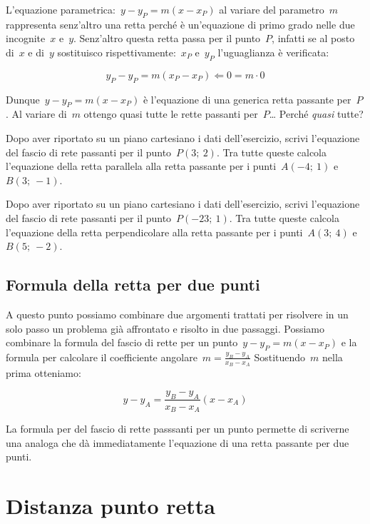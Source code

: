 L'equazione parametrica:~\(y - y_P = m (x - x_P)\) al variare del parametro~\(m\) 
rappresenta senz'altro una retta perché è un'equazione di primo grado nelle 
due incognite~\(x\) e~\(y\). Senz'altro questa retta passa per il punto~\(P\), 
infatti se al posto di~\(x\) e di~\(y\) sostituisco 
rispettivamente:~\(x_P\) e~\(y_P\) l'uguaglianza è verificata:

\[y_P - y_P = m (x_P - x_P) \Leftarrow 0 = m \cdot 0\]

Dunque~\(y - y_P = m (x - x_P)\) è l'equazione di una generica retta passante 
per~\(P\). Al variare di~\(m\) ottengo quasi tutte le rette passanti per~\(P\)\dots 
Perché \emph{quasi} tutte?

\begin{exrig}
 \begin{esempio}
  Dopo aver riportato su un piano cartesiano i dati dell'esercizio,
  scrivi l'equazione del fascio di rete passanti per il punto~\(P(3;~2)\).
  Tra tutte queste calcola l'equazione della retta parallela alla retta 
  passante per i punti~\(A(-4;~1)\) e~\(B(3;~-1)\).
 \end{esempio}
 \begin{esempio}
  Dopo aver riportato su un piano cartesiano i dati dell'esercizio,
  scrivi l'equazione del fascio di rete passanti per il punto~\(P(-23;~1)\).
  Tra tutte queste calcola l'equazione della retta perpendicolare alla retta 
  passante per i punti~\(A(3;~4)\) e~\(B(5;~-2)\).
 \end{esempio}
\end{exrig}

\subsection{Formula della retta per due punti}

A questo punto possiamo combinare due argomenti trattati per risolvere in un
solo passo un problema già affrontato e risolto in due passaggi. 
Possiamo combinare la formula del fascio di rette per un 
punto~\(y - y_P = m (x - x_P)\)
e la formula per calcolare il 
coefficiente angolare~\(m = \frac{y_B - y_A}{x_B - x_A}\) 
Sostituendo~\(m\) nella prima otteniamo:

\[y - y_A = \frac{y_B - y_A}{x_B - x_A} (x - x_A)\]

La formula per del fascio di rette passsanti per un punto permette di 
scriverne una analoga che dà immediatamente l'equazione di una retta passante 
per due punti.

\section{Distanza punto retta}
\label{sec:retta_distanzapuntoretta}

